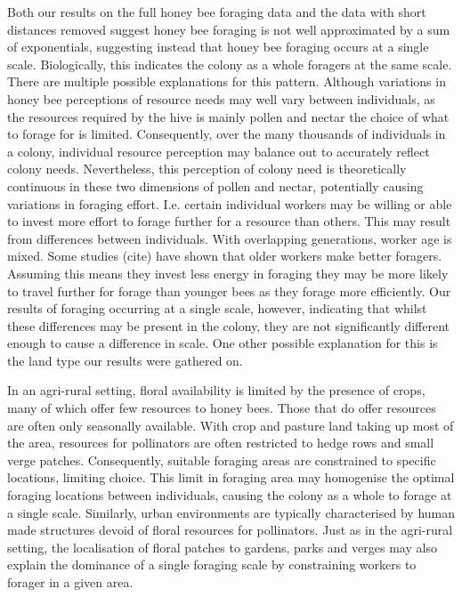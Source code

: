 \documentclass[11pt,usenames,dvipsnames]{article}
\begin{document}
Both our results on the full honey bee foraging data and the data with short distances removed suggest honey bee foraging is not well approximated by a sum of exponentials, suggesting instead that honey bee foraging occurs at a single scale. Biologically, this indicates the colony as a whole foragers at the same scale. There are multiple possible explanations for this pattern. Although variations in honey bee perceptions of resource needs may well vary between individuals, as the resources required by the hive is mainly pollen and nectar the choice of what to forage for is limited. Consequently, over the many thousands of individuals in a colony, individual resource perception may balance out to accurately reflect colony needs. Nevertheless, this perception of colony need is theoretically continuous in these two dimensions of pollen and nectar, potentially causing variations in foraging effort. I.e. certain individual workers may be willing or able to invest more effort to forage further for a resource than others. This may result from differences between individuals. With overlapping generations, worker age is mixed. Some studies (cite) have shown that older workers make better foragers. Assuming this means they invest less energy in foraging they may be more likely to travel further for forage than younger bees as they forage more efficiently. Our results of foraging occurring at a single scale, however, indicating that whilst these differences may be present in the colony, they are not significantly different enough to cause a difference in scale. One other possible explanation for this is the land type our results were gathered on.

In an agri-rural setting, floral availability is limited by the presence of crops, many of which offer few resources to honey bees. Those that do offer resources are often only seasonally available. With crop and pasture land taking up most of the area, resources for pollinators are often restricted to hedge rows and small verge patches. Consequently, suitable foraging areas are constrained to specific locations, limiting choice. This limit in foraging area may homogenise the optimal foraging locations between individuals, causing the colony as a whole to forage at a single scale. Similarly, urban environments are typically characterised by human made structures devoid of floral resources for pollinators. Just as in the agri-rural setting, the localisation of floral patches to gardens, parks and verges may also explain the dominance of a single foraging scale by constraining workers to forager in a given area. 
\end{document}
